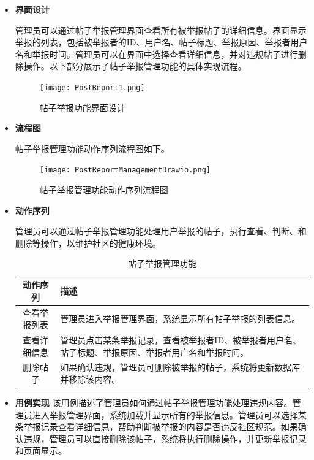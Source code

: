 \begin{itemize}
	\item \textbf{界面设计}
	
	管理员可以通过帖子举报管理界面查看所有被举报帖子的详细信息。界面显示举报的列表，包括被举报者的ID、用户名、帖子标题、举报原因、举报者用户名和举报时间。管理员可以在界面中选择查看详细信息，并对违规帖子进行删除操作。以下部分展示了帖子举报管理功能的具体实现流程。

	\begin{figure}[H]
		\centering
		\texttt{[image: PostReport1.png]}
		\caption{帖子举报功能界面设计}
		\label{fig:post-report.png}
	\end{figure}


	\item \textbf{流程图}
	
	帖子举报管理功能动作序列流程图如下。
	
	\begin{figure}[H]
		\centering
		\texttt{[image: PostReportManagementDrawio.png]} 
		\caption{帖子举报管理功能动作序列流程图}
		\label{fig:post-report-management.drawio}
	\end{figure}
	
	\item \textbf{动作序列}
	
	管理员可以通过帖子举报管理功能处理用户举报的帖子，执行查看、判断、和删除等操作，以维护社区的健康环境。


	\begin{table}[h]
		\centering
		\caption{帖子举报管理功能}
		\renewcommand\arraystretch{1.5}
		\begin{tabular}{|c|>{\raggedright\arraybackslash}p{8cm}|}
			\hline
			\textbf{动作序列} & \textbf{描述} \\ \hline
			查看举报列表 & 管理员进入举报管理界面，系统显示所有帖子举报的列表信息。 \\ \hline
			查看详细信息 & 管理员点击某条举报记录，查看被举报者ID、被举报者用户名、帖子标题、举报原因、举报者用户名和举报时间。 \\ \hline
			删除帖子 & 如果确认违规，管理员可删除被举报的帖子，系统将更新数据库并移除该内容。 \\ \hline
		\end{tabular}
		
	\end{table}
	
	\item \textbf{用例实现}
	该用例描述了管理员如何通过帖子举报管理功能处理违规内容。管理员进入举报管理界面，系统加载并显示所有的举报信息。管理员可以选择某条举报记录查看详细信息，帮助判断被举报的内容是否违反社区规范。如果确认违规，管理员可以直接删除该帖子，系统将执行删除操作，并更新举报记录和页面显示。


\end{itemize}
